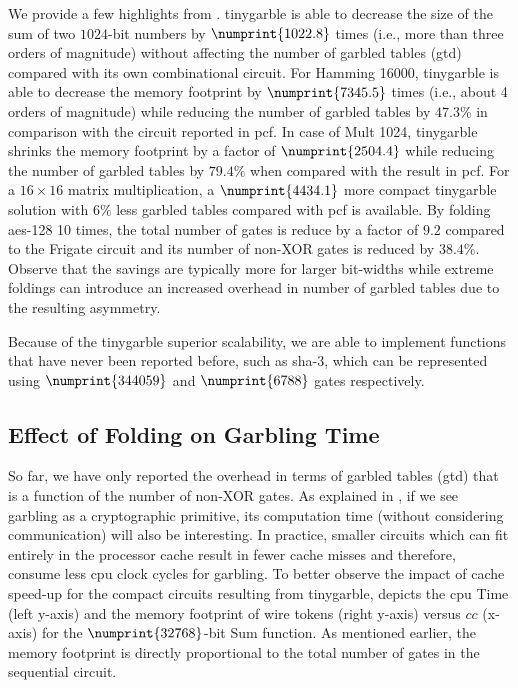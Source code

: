 We provide a few highlights from .
\gls{tinygarble} is able to decrease the size of the sum of two $1024$-bit numbers by $\numprint{1022.8}$ times (i.e., more than three orders of magnitude) without affecting the number of garbled tables (\acrshort{gtd}) compared with its own combinational circuit.
For Hamming 16000, \gls{tinygarble} is able to decrease the memory footprint by $\numprint{7345.5}$ times (i.e., about 4 orders of magnitude) while reducing the number of garbled tables by $47.3\%$ in comparison with the circuit reported in \gls{pcf}.
In case of Mult 1024, \gls{tinygarble} shrinks the memory footprint by a factor of $\numprint{2504.4}$ while reducing the number of garbled tables by $79.4\%$ when compared with the result in \gls{pcf}.
For a $16\times 16$ matrix multiplication, a $\numprint{4434.1}$ more compact \gls{tinygarble} solution with $6\%$ less garbled tables compared with \gls{pcf} is available.
By folding \acrshort{aes}-128 10 times, the total number of gates is reduce by a factor of $9.2$ compared to the Frigate circuit and its number of non-XOR gates is reduced by $38.4\%$.
Observe that the savings are typically more for larger bit-widths while extreme foldings can introduce an increased overhead in number of garbled tables due to the resulting asymmetry.

Because of the \gls{tinygarble} superior scalability, we are able to implement functions that have never been reported before, such as \acrshort{sha}-3, which can be represented using $\numprint{344059}$ and $\numprint{6788}$ gates respectively.

\subsection{Effect of Folding on Garbling Time} \label{ssec:eval-tinygarble-timing}
So far, we have only reported the overhead in terms of garbled tables (\acrshort{gtd}) that is a function of the number of non-XOR gates.
As explained in \cite{bellare2013efficient}, if we see garbling as a cryptographic primitive, its computation time (without considering communication) will also be interesting.
In practice, smaller circuits which can fit entirely in the processor cache result in fewer cache misses and therefore, consume less \acrshort{cpu} clock cycles for garbling.
To better observe the impact of cache speed-up for the compact circuits resulting from \gls{tinygarble},  depicts the \acrshort{cpu} Time (left y-axis) and the memory footprint of wire tokens (right y-axis) versus $cc$ (x-axis) for the $\numprint{32768}$-bit Sum function.
As mentioned earlier, the memory footprint is directly proportional to the total number of gates in the sequential circuit.

